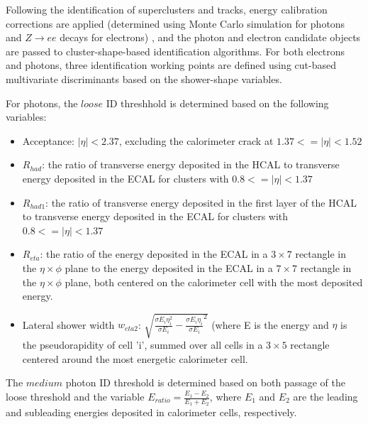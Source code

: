 Following the identification of superclusters and tracks, energy calibration corrections are applied (determined using Monte Carlo simulation for photons and $Z \rightarrow ee$ decays for electrons) \cite{photuncs}, and the photon and electron candidate objects are passed to cluster-shape-based identification algorithms. For both electrons and photons, three identification working points are defined using cut-based multivariate discriminants based on the shower-shape variables.

For photons, the $loose$ ID threshhold is determined based on the following variables:
\begin{itemize}
  \item Acceptance: $|\eta|<2.37$, excluding the calorimeter crack at $1.37 <= |\eta|<1.52$  
  \item $R_{had}$: the ratio of transverse energy deposited in the HCAL to transverse energy deposited in the ECAL for clusters with $0.8 <= |\eta|<1.37$ 
  \item $R_{had1}$: the ratio of transverse energy deposited in the first layer of the HCAL to transverse energy deposited in the ECAL for clusters with $0.8 <= |\eta|<1.37$ 
  \item $R_{eta}$: the ratio of the energy deposited in the ECAL in a $3 \times 7$ rectangle in the $\eta \times \phi$ plane to the energy deposited in the ECAL in a $7 \times 7$ rectangle in the $\eta \times \phi$ plane, both centered on the calorimeter cell with the most deposited energy. 
   \item Lateral shower width $w_{eta2}$: $\sqrt{\frac{\sigma E_{i} \eta_{i}^{2}}{\sigma E_{i}}-{\frac{\sigma E_{i} \eta_{i}}{\sigma E_{i}}}^2}$ (where E is the energy and $\eta$ is the pseudorapidity of cell 'i', summed over all cells in a $3 \times 5$ rectangle centered around the most energetic calorimeter cell. 
\end{itemize}

The $medium$ photon ID threshold is determined based on both passage of the loose threshold and the variable $E_{ratio} = \frac{E_{1}-E_{2}}{E_{1}+E_{2}}$, where $E_{1}$ and $E_{2}$ are the leading and subleading energies deposited in calorimeter cells, respectively.

